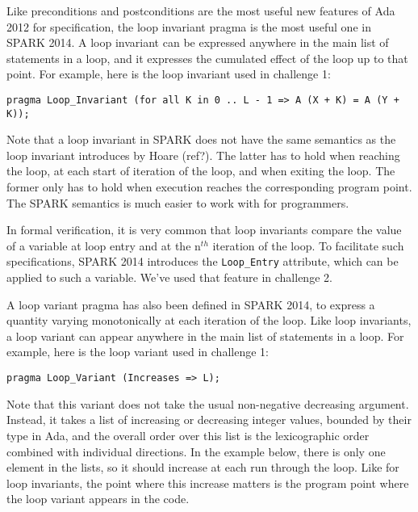 \documentclass[sttt,draft]{svjour}
\begin{document}
Like preconditions and postconditions are the most useful new features of Ada
2012 for specification, the loop invariant pragma is the most useful one in
SPARK 2014. A loop invariant can be expressed anywhere in the main list of
statements in a loop, and it expresses the cumulated effect of the loop up to
that point. For example, here is the loop invariant used in challenge 1:

\begin{footnotesize}
\begin{verbatim}
pragma Loop_Invariant (for all K in 0 .. L - 1 => A (X + K) = A (Y + K));
\end{verbatim}
\end{footnotesize}

Note that a loop invariant in SPARK does not have the same semantics as the
loop invariant introduces by Hoare (ref?). The latter has to hold when reaching
the loop, at each start of iteration of the loop, and when exiting the
loop. The former only has to hold when execution reaches the corresponding
program point. The SPARK semantics is much easier to work with for programmers.

In formal verification, it is very common that loop invariants compare the
value of a variable at loop entry and at the n$^{th}$ iteration of the loop. To
facilitate such specifications, SPARK 2014 introduces the \verb|Loop_Entry|
attribute, which can be applied to such a variable. We've used that feature in
challenge 2.

A loop variant pragma has also been defined in SPARK 2014, to express a
quantity varying monotonically at each iteration of the loop. Like loop
invariants, a loop variant can appear anywhere in the main list of statements
in a loop. For example, here is the loop variant used in challenge 1:

\begin{footnotesize}
\begin{verbatim}
pragma Loop_Variant (Increases => L);
\end{verbatim}
\end{footnotesize}

Note that this variant does not take the usual non-negative decreasing
argument. Instead, it takes a list of increasing or decreasing integer values,
bounded by their type in Ada, and the overall order over this list is the
lexicographic order combined with individual directions. In the example below,
there is only one element in the lists, so it should increase at each run
through the loop. Like for loop invariants, the point where this increase
matters is the program point where the loop variant appears in the code.
\end{document}
